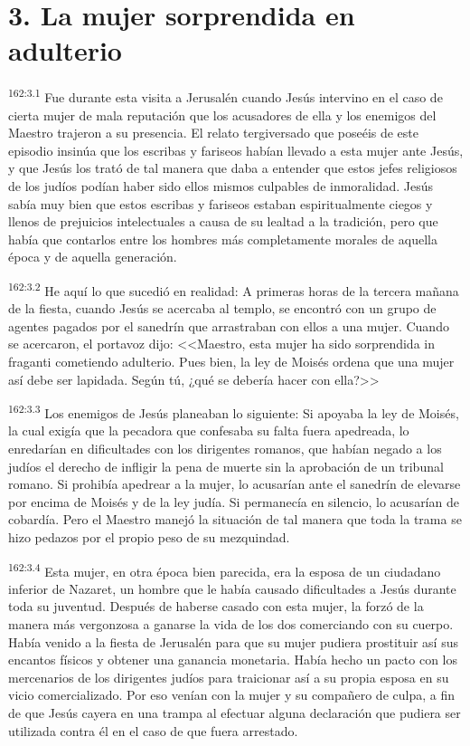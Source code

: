 \section*{3. La mujer sorprendida en adulterio}
\par 
\textsuperscript{162:3.1} Fue durante esta visita a Jerusalén cuando Jesús intervino en el caso de cierta mujer de mala reputación que los acusadores de ella y los enemigos del Maestro trajeron a su presencia. El relato tergiversado que poseéis de este episodio insinúa que los escribas y fariseos habían llevado a esta mujer ante Jesús, y que Jesús los trató de tal manera que daba a entender que estos jefes religiosos de los judíos podían haber sido ellos mismos culpables de inmoralidad. Jesús sabía muy bien que estos escribas y fariseos estaban espiritualmente ciegos y llenos de prejuicios intelectuales a causa de su lealtad a la tradición, pero que había que contarlos entre los hombres más completamente morales de aquella época y de aquella generación.

\par 
\textsuperscript{162:3.2} He aquí lo que sucedió en realidad: A primeras horas de la tercera mañana de la fiesta, cuando Jesús se acercaba al templo, se encontró con un grupo de agentes pagados por el sanedrín que arrastraban con ellos a una mujer. Cuando se acercaron, el portavoz dijo: <<Maestro, esta mujer ha sido sorprendida in fraganti cometiendo adulterio. Pues bien, la ley de Moisés ordena que una mujer así debe ser lapidada. Según tú, ¿qué se debería hacer con ella?>>

\par 
\textsuperscript{162:3.3} Los enemigos de Jesús planeaban lo siguiente: Si apoyaba la ley de Moisés, la cual exigía que la pecadora que confesaba su falta fuera apedreada, lo enredarían en dificultades con los dirigentes romanos, que habían negado a los judíos el derecho de infligir la pena de muerte sin la aprobación de un tribunal romano. Si prohibía apedrear a la mujer, lo acusarían ante el sanedrín de elevarse por encima de Moisés y de la ley judía. Si permanecía en silencio, lo acusarían de cobardía. Pero el Maestro manejó la situación de tal manera que toda la trama se hizo pedazos por el propio peso de su mezquindad.

\par 
\textsuperscript{162:3.4} Esta mujer, en otra época bien parecida, era la esposa de un ciudadano inferior de Nazaret, un hombre que le había causado dificultades a Jesús durante toda su juventud. Después de haberse casado con esta mujer, la forzó de la manera más vergonzosa a ganarse la vida de los dos comerciando con su cuerpo. Había venido a la fiesta de Jerusalén para que su mujer pudiera prostituir así sus encantos físicos y obtener una ganancia monetaria. Había hecho un pacto con los mercenarios de los dirigentes judíos para traicionar así a su propia esposa en su vicio comercializado. Por eso venían con la mujer y su compañero de culpa, a fin de que Jesús cayera en una trampa al efectuar alguna declaración que pudiera ser utilizada contra él en el caso de que fuera arrestado.

